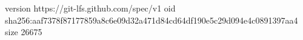 version https://git-lfs.github.com/spec/v1
oid sha256:aaf7378f87177859a8c6e09d32a471d84cd64df190e5c29d094e4c0891397aa4
size 26675
